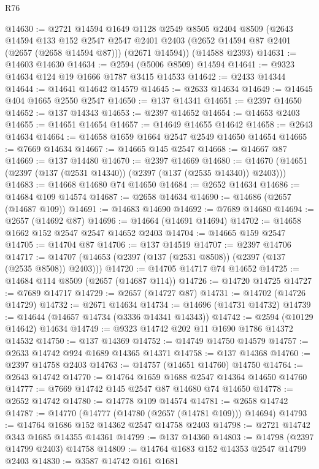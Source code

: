 \begin{lexlean}{R76}
\begin{coremodule}
@14630 := @2721
    @14594
    @1649
    @1128
    @2549
    @8505
    @2404
    @8509
    (@2643
      @14594
      @133
      @152
      @2547
      @2547
      @2401
      @2403
      (@2652 @14594 @87 @2401 (@2657 (@2658 @14594 @87)))
      (@2671 @14594))
    (@14588 @2393)
@14631 := @14603 @14630
@14634 := @2594 (@5006 @8509) @14594
@14641 := @9323 @14634 @124 @19 @1666 @1787 @3415 @14533
@14642 := @2433 @14344
@14644 := @14641 @14642 @14579
@14645 := @2633 @14634
@14649 := @14645 @404 @1665 @2550 @2547
@14650 := @137 @14341
@14651 := @2397 @14650
@14652 := @137 @14343
@14653 := @2397 @14652
@14654 := @14653 @2403
@14655 := @14651 @14654
@14657 := @14649 @14655 @14642
@14658 := @2643 @14634
@14664 := @14658 @1659 @1664 @2547 @2549 @14650 @14654
@14665 := @7669 @14634
@14667 := @14665 @145 @2547
@14668 := @14667 @87
@14669 := @137 @14480
@14670 := @2397 @14669
@14680 := @14670 (@14651 (@2397 (@137 (@2531 @14340)) (@2397 (@137 (@2535 @14340)) @2403)))
@14683 := @14668 @14680 @74 @14650
@14684 := @2652 @14634
@14686 := @14684 @109 @14574
@14687 := @2658 @14634
@14690 := @14686 (@2657 (@14687 @109))
@14691 := @14683 @14690
@14692 := @7689 @14680
@14694 := @2657 (@14692 @87)
@14696 := @14664 (@14691 @14694)
@14702 := @14658 @1662 @152 @2547 @2547 @14652 @2403
@14704 := @14665 @159 @2547
@14705 := @14704 @87
@14706 := @137 @14519
@14707 := @2397 @14706
@14717 := @14707 (@14653 (@2397 (@137 (@2531 @8508)) (@2397 (@137 (@2535 @8508)) @2403)))
@14720 := @14705 @14717 @74 @14652
@14725 := @14684 @114 @8509 (@2657 (@14687 @114))
@14726 := @14720 @14725
@14727 := @7689 @14717
@14729 := @2657 (@14727 @87)
@14731 := @14702 (@14726 @14729)
@14732 := @2671 @14634
@14734 := @14696 (@14731 @14732)
@14739 := @14644 (@14657 @14734 (@3336 @14341 @14343))
@14742 := @2594 (@10129 @14642) @14634
@14749 := @9323 @14742 @202 @11 @1690 @1786 @14372 @14532
@14750 := @137 @14369
@14752 := @14749 @14750 @14579
@14757 := @2633 @14742 @924 @1689 @14365 @14371
@14758 := @137 @14368
@14760 := @2397 @14758 @2403
@14763 := @14757 (@14651 @14760) @14750
@14764 := @2643 @14742
@14770 := @14764 @1659 @1688 @2547 @14364 @14650 @14760
@14777 := @7669 @14742 @145 @2547 @87 @14680 @74 @14650
@14778 := @2652 @14742
@14780 := @14778 @109 @14574
@14781 := @2658 @14742
@14787 := @14770 (@14777 (@14780 (@2657 (@14781 @109))) @14694)
@14793 := @14764 @1686 @152 @14362 @2547 @14758 @2403
@14798 := @2721 @14742 @343 @1685 @14355 @14361
@14799 := @137 @14360
@14803 := @14798 (@2397 @14799 @2403) @14758
@14809 := @14764 @1683 @152 @14353 @2547 @14799 @2403
@14830 := @3587
    @14742
    @161
    @1681

\end{coremodule}
\end{lexlean}
